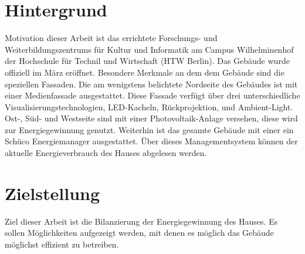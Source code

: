 \section{Hintergrund}
Motivation dieser Arbeit ist das errichtete Forschungs- und Weiterbildungszentrums für Kultur und Informatik am Campus Wilhelminenhof der Hochschule für Technil und Wirtschaft (HTW Berlin). Das Gebäude wurde offiziell im März eröffnet. Besondere Merkmale an dem dem Gebäude sind die speziellen Fassaden. Die am wenigstens belichtete Nordseite des Gebäudes ist mit einer Medienfassade ausgestattet. Diese Fassade verfügt über drei unterschiedliche Visualisierungstechnologien, LED-Kacheln, Rückprojektion, und Ambient-Light. Ost-, Süd- und Westseite sind mit einer Photovoltaik-Anlage versehen, diese wird zur Energiegewinnung genutzt. Weiterhin ist das gesamte Gebäude mit einer ein Schüco Energiemanager ausgestattet. Über dieses Managementsystem können der aktuelle Energieverbrauch des Hauses abgelesen werden.

\section{Zielstellung}
Ziel dieser Arbeit ist die Bilanzierung der Energiegewinnung des Hauses. Es sollen Möglichkeiten aufgezeigt werden, mit denen es möglich das Gebäude möglichst effizient zu betreiben.